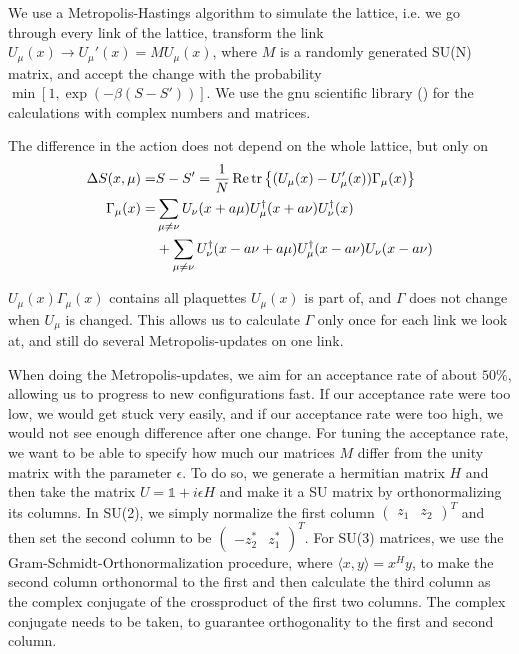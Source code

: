 \documentclass[%
 reprint,
 amsmath,amssymb,
 aps,
]{revtex4-1}
\renewcommand{\Re}{\operatorname{Re}}
\begin{document}
We use a Metropolis-Hastings algorithm to simulate the lattice, i.e. we go through every link of the lattice, transform the link $U_\mu(x)\to U_\mu'(x)=MU_\mu(x)$, where $M$ is a randomly generated SU(N) matrix, and accept the change with the probability $\min[1, \exp(-\beta(S-S'))]$. We use the gnu scientific library (\citet{gsldoc_total}) for the calculations with complex numbers and matrices.

The difference in the action does not depend on the whole lattice, but only on \begin{align*}
\Delta S(x, \mu)=&S-S'=\frac{1}{N}\Re\tr\left\lbrace (U_\mu(x)-U'_\mu(x))\Gamma_\mu(x)\right\rbrace\\
%
\Gamma_\mu(x)=&\sum_{\mu\neq\nu}U_\nu(x+a\mu)U_\mu^\dagger(x+a\nu)U_\nu^\dagger(x)\\
%
&+\sum_{\mu\neq\nu}U^\dagger_\nu(x-a\nu+a\mu) U^\dagger_\mu(x-a\nu)U_\nu(x-a\nu)
\end{align*}

$U_\mu(x)\Gamma_\mu(x)$ contains all plaquettes $U_\mu(x)$ is part of, and $\Gamma$ does not change when $U_\mu$ is changed. This allows us to calculate $\Gamma$ only once for each link we look at, and still do several Metropolis-updates on one link.

When doing the Metropolis-updates, we aim for an acceptance rate of about $50\%$, allowing us to progress to new configurations fast. If our acceptance rate were too low, we would get stuck very easily, and if our acceptance rate were too high, we would not see enough difference after one change.
For tuning the acceptance rate, we want to be able to specify how much our matrices $M$ differ from the unity matrix with the parameter $\epsilon$. To do so, we generate a hermitian matrix $H$   and then take the matrix $U=\mathbb{1}+i\epsilon H$ and make it a SU matrix by orthonormalizing its columns. In SU(2), we simply normalize the first column $\begin{pmatrix}z_1&z_2\end{pmatrix}^T$ and then set the second column to be $\begin{pmatrix}-z_2^*&z_1^*\end{pmatrix}^T$. For SU(3) matrices, we use the Gram-Schmidt-Orthonormalization procedure, where $\langle x,y\rangle=x^Hy$, to make the second column orthonormal to the first and then calculate the third column as the complex conjugate of the crossproduct of the first two columns. The complex conjugate needs to be taken, to guarantee orthogonality to the first and second column.
\end{document}
